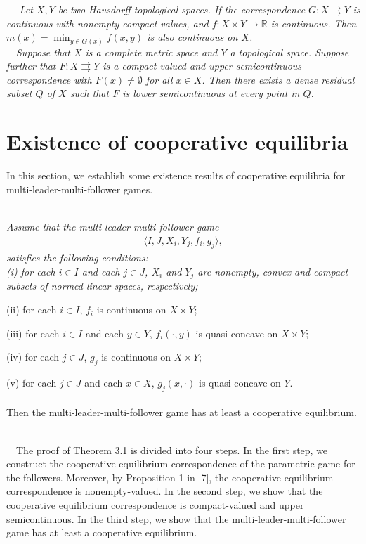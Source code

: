 ~~{\it
Let $X, Y$ be two Hausdorff topological spaces.
If the correspondence $G : X\rightrightarrows Y$ is continuous with nonempty
compact values, and
$f : X \times Y \longrightarrow \mathbb{R}$ is continuous. Then
$m(x) = \min_{y\in G(x)}f(x, y)$ is also continuous on $X$.}
\\

~~{\it Suppose that $X$ is a complete
metric space and $Y$ a topological space.
Suppose further that $F : X \rightrightarrows Y$ is a compact-valued and upper semicontinuous correspondence
with $F(x)\neq\emptyset$ for all $x\in X$. Then there exists a dense residual subset $Q$ of $X$ such that $F$ is lower
semicontinuous at every point in $Q$.}


\section{Existence of cooperative equilibria}

In this section, we establish some existence results of cooperative equilibria for
multi-leader-multi-follower games.
\\

~~{\it Assume that the
multi-leader-multi-follower game
\begin{eqnarray*}
\langle I,J,X_i,Y_j,f_i,g_j\rangle,
\end{eqnarray*}
satisfies the following conditions:
\\

(i) for each $i\in I$ and each $j\in J$, $X_i$ and $Y_j$ are nonempty, convex and
compact subsets of normed linear spaces, respectively;

(ii) for each $i\in I$, $f_i$ is continuous on $X\times Y$;

(iii) for each $i\in I$ and each $y\in Y$, $f_i(\cdot,y)$ is quasi-concave on $X\times Y$;

(iv) for each $j\in J$, $g_j$ is continuous on $X\times Y$;

(v)  for each $j\in J$ and each $x\in X$, $g_j(x,\cdot)$ is quasi-concave on $Y$.
\\
\\
Then the multi-leader-multi-follower game
has at least a cooperative equilibrium.}
\\

~~The proof of Theorem 3.1 is divided into four steps.
In the first step, we construct the cooperative equilibrium correspondence
of the parametric game for the followers. Moreover, by Proposition 1 in [7],
the cooperative equilibrium correspondence is nonempty-valued.
In the second step, we show that the cooperative equilibrium correspondence is
compact-valued and upper semicontinuous. In the third step,
we show that the multi-leader-multi-follower game
has at least a cooperative equilibrium.


